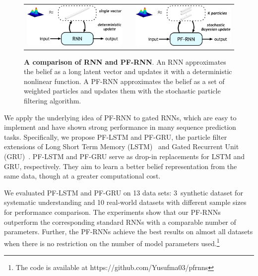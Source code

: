 \documentclass[letterpaper]{article} %
\begin{document}
\begin{figure}[t]
	\centering
	\begin{tabular}{c c c}
		\includegraphics[width=0.4\linewidth]{figs/RNN_overview.pdf} &
		 &
		\includegraphics[width=0.4\linewidth]{figs/PFRNN_overview.pdf}
	\end{tabular}
	\centering
	\caption{\textbf{A comparison of RNN and PF-RNN}. An RNN approximates the belief as a long latent vector and updates it with a deterministic nonlinear function. A PF-RNN approximates the belief as a set of weighted  particles and updates them with the stochastic particle filtering algorithm.}
	\label{fig:fig1_comparison}
\end{figure}

We apply the underlying idea of PF-RNN to gated RNNs, which are easy to implement and have shown strong performance in many sequence prediction tasks.
Specifically, we propose PF-LSTM and PF-GRU, the particle filter extensions of  Long Short Term Memory (LSTM)~\cite{hochreiter1997long} and Gated Recurrent Unit (GRU)~\cite{cho2014learning}. PF-LSTM and PF-GRU 
serve as drop-in replacements for LSTM and GRU, respectively. They aim to learn a better belief representation from the same data, 
though at a greater computational cost.

We evaluated  PF-LSTM and  PF-GRU on 13 data sets: 3~synthetic dataset for systematic understanding and 10 real-world datasets with different sample sizes for performance comparison. 
The experiments show that our  PF-RNNs outperform the corresponding standard RNNs with a comparable number of parameters. Further, the PF-RNNs achieve the best results on almost all datasets when there is no restriction on the number of model parameters used.\footnote{The code is available at https://github.com/Yusufma03/pfrnns}
\end{document}
